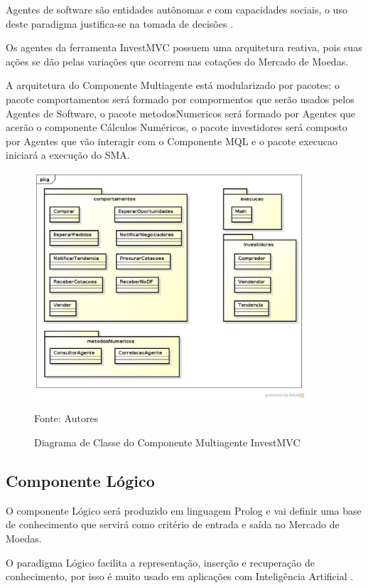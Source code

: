 Agentes de software são entidades autônomas e com capacidades sociais, o uso deste paradigma justifica-se na tomada de decisões \cite{agentBuilderWhy}. 

Os agentes da ferramenta  InvestMVC possuem uma arquitetura reativa, pois suas ações se dão pelas variações que ocorrem nas cotações do Mercado de Moedas.

A arquitetura do Componente Multiagente está modularizado por pacotes: o pacote comportamentos será formado por compormentos que serão usados pelos Agentes de Software, o pacote metodosNumericos será formado por Agentes que acerão o componente Cálculos Numéricos, o pacote investidores será composto por Agentes que vão interagir com o Componente MQL e o pacote execucao iniciará a execução do SMA.

\begin{figure}[htp]
\centering
\includegraphics[width=0.9\textwidth]{figuras/diagramaClassesSMA}
\caption{Diagrama de Classe do Componente Multiagente InvestMVC}{Fonte: Autores} 
\label{diagramaClassesSMA}
\end{figure}

\subsection{Componente Lógico}

O componente Lógico será produzido em linguagem Prolog e vai definir uma base de conhecimento que servirá como critério de entrada e saída no Mercado de Moedas.

O paradigma Lógico facilita a representação, inserção e recuperação de conhecimento, por isso é muito usado em aplicações com Inteligência Artificial \cite{almeida2010}.

